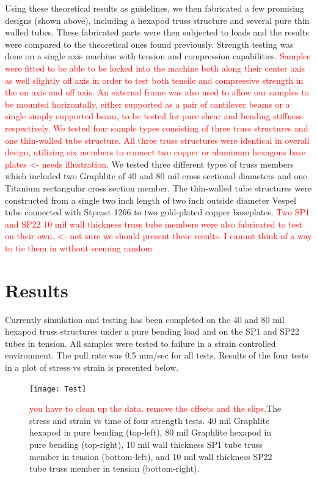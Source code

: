 \documentclass[final]{svjour2}
\begin{document}
Using these theoretical results as guidelines, we then fabricated a few promising designs (shown above), including a hexapod truss structure and several pure thin walled tubes. These fabricated parts were then subjected to loads and the results were compared to the theoretical ones found previously.  Strength testing was done on a single axis machine with tension and compression capabilities. \textcolor{red}{Samples were fitted to be able to be locked into the machine both along their center axis as well slightly off axis in order to test both tensile and compressive strength in the on axis and off axis.  An external frame was also used to allow our samples to be mounted horizontally, either supported as a pair of cantilever beams or a single simply supported beam, to be tested for pure shear and bending stiffness respectively.  We tested four sample types consisting of three truss structures and one thin-walled tube structure.  All three truss structures were identical in overall design, utilizing six members to connect two copper or aluminum hexagons base plates <- needs illustration}.  We tested three different types of truss members which included two Graphlite of 40 and 80 mil cross sectional diameters and one Titanium rectangular cross section member. The thin-walled tube structures were constructed from a single two inch length of two inch outside diameter Vespel tube connected with Stycast 1266 to two gold-plated copper baseplates. \textcolor{red} {Two SP1 and SP22 10 mil wall thickness truss tube members were also fabricated to test on their own. <- not sure we should present these results. I cannot think of a way to tie them in without seeming random}

\section{Results}
Currently simulation and testing has been completed on the 40 and 80 mil hexapod truss structures under a pure bending load and on the SP1 and SP22 tubes in tension.  
All samples were tested to failure in a strain controlled environment.  The pull rate was 0.5 mm/sec for all tests.  Results of the four tests in a plot of stress vs strain is presented below.

\begin{figure}[!ht]
\begin{center}
\texttt{[image: Test]}
\end{center}
\caption{\textcolor{red}{you have to clean up the data. remove the offsets and the slips.}The stress and strain vs time of four strength tests. 40 mil Graphlite hexapod in pure bending (top-left), 80 mil Graphlite hexapod in pure bending (top-right), 10 mil wall thickness SP1 tube truss member in tension (bottom-left), and 10 mil wall thickness SP22 tube truss member in tension (bottom-right).}
\label{Test}
\end{figure}
\end{document}
